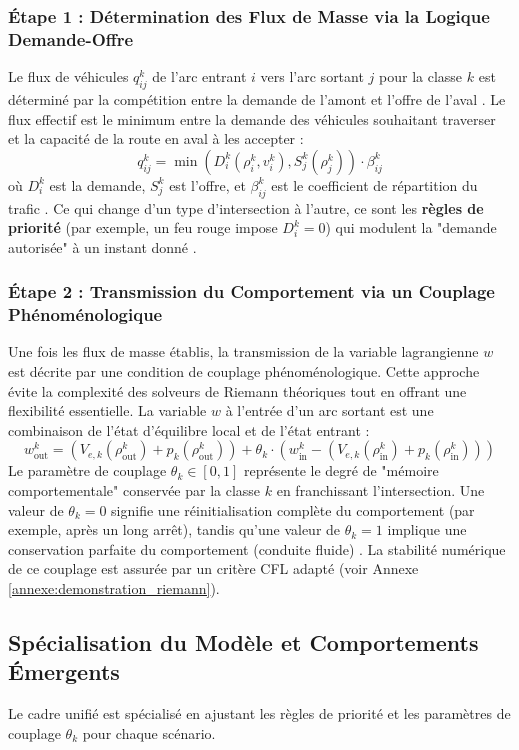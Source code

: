 \subsubsection{Étape 1 : Détermination des Flux de Masse via la Logique Demande-Offre}
Le flux de véhicules $ q_{ij}^k $ de l'arc entrant $ i $ vers l'arc sortant $ j $ pour la classe $ k $ est déterminé par la compétition entre la demande de l'amont et l'offre de l'aval \cite{Daganzo1995, Lebacque1996}. Le flux effectif est le minimum entre la demande des véhicules souhaitant traverser et la capacité de la route en aval à les accepter :
\[
    q_{ij}^k = \min\left(D_i^k(\rho_i^k, v_i^k), S_j^k(\rho_j^k)\right) \cdot \beta_{ij}^k
\]
où $ D_i^k $ est la demande, $ S_j^k $ est l'offre, et $ \beta_{ij}^k $ est le coefficient de répartition du trafic \cite{CocliteGaravelloPiccoli2005}. Ce qui change d'un type d'intersection à l'autre, ce sont les \textbf{règles de priorité} (par exemple, un feu rouge impose $D_i^k = 0$) qui modulent la "demande autorisée" à un instant donné \cite{BressonPiccoli2019}.

\subsubsection{Étape 2 : Transmission du Comportement via un Couplage Phénoménologique}
Une fois les flux de masse établis, la transmission de la variable lagrangienne $ w $ est décrite par une condition de couplage phénoménologique. Cette approche évite la complexité des solveurs de Riemann théoriques \cite{GaravelloPiccoli2006} tout en offrant une flexibilité essentielle. La variable $ w $ à l'entrée d'un arc sortant est une combinaison de l'état d'équilibre local et de l'état entrant :
\[
    w_{\text{out}}^k = \left(V_{e,k}(\rho_{\text{out}}^k) + p_k(\rho_{\text{out}}^k)\right) + \theta_k \cdot \left(w_{\text{in}}^k - \left(V_{e,k}(\rho_{\text{in}}^k) + p_k(\rho_{\text{in}}^k)\right)\right)
\]
Le paramètre de couplage $ \theta_k \in [0,1] $ représente le degré de "mémoire comportementale" conservée par la classe $ k $ en franchissant l'intersection. Une valeur de $\theta_k=0$ signifie une réinitialisation complète du comportement (par exemple, après un long arrêt), tandis qu'une valeur de $\theta_k=1$ implique une conservation parfaite du comportement (conduite fluide) \cite{HertyKlar2003}. La stabilité numérique de ce couplage est assurée par un critère CFL adapté (voir Annexe \ref{annexe:demonstration_riemann}).

\subsection{Spécialisation du Modèle et Comportements Émergents}
Le cadre unifié est spécialisé en ajustant les règles de priorité et les paramètres de couplage $\theta_k$ pour chaque scénario.

